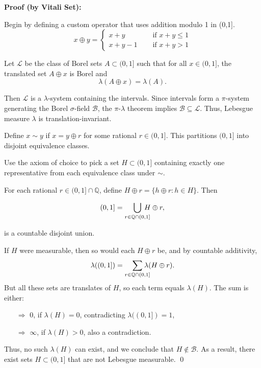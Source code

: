     \textbf{Proof (by Vitali Set):}
    \vspace{-1ex}
    \begin{proofline}
    Begin by defining a custom operator that uses addition modulo 1 in (0,1].
    \[
    x\oplus y = \begin{cases}
        x+y \quad &\text{ if } x+y \leq 1\\
        x+y-1 \quad &\text{ if } x+y > 1
    \end{cases}
    \]

    Let \( \mathcal{L} \) be the class of Borel sets \( A \subset (0,1] \) such that for all \( x \in (0,1] \), the translated set \( A \oplus x \) is Borel and
    \[
    \lambda(A \oplus x) = \lambda(A).
    \]
    
    Then \( \mathcal{L} \) is a \( \lambda \)-system containing the intervals. Since intervals form a \( \pi \)-system generating the Borel \( \sigma \)-field \( \mathcal{B} \), the \( \pi \)-\( \lambda \) theorem implies \( \mathcal{B} \subseteq \mathcal{L} \). Thus, Lebesgue measure \( \lambda \) is translation-invariant.

    Define \( x \sim y \) if \( x = y \oplus r \) for some rational \( r \in (0,1] \). This partitions \( (0,1] \) into disjoint equivalence classes.

    Use the axiom of choice to pick a set \( H \subset (0,1] \) containing exactly one representative from each equivalence class under \( \sim \).

    For each rational \( r \in (0,1] \cap \mathbb{Q} \), define \( H \oplus r = \{ h \oplus r : h \in H \} \). Then
    
    \[
    (0,1] = \bigcup_{r \in \mathbb{Q} \cap (0,1]} \hspace{-1em}H \oplus r,
    \]
    
    is a countable disjoint union.

    If \( H \) were measurable, then so would each \( H \oplus r \) be, and by countable additivity,
    \[
    \lambda((0,1]) = \sum_{r \in \mathbb{Q} \cap (0,1]} \hspace{-1em}\lambda(H \oplus r).
    \]
    But all these sets are translates of \( H \), so each term equals \( \lambda(H) \). The sum is either:
    \begin{itemize}
        \item[$\Rightarrow$] 0, if \( \lambda(H) = 0 \), contradicting \( \lambda((0,1]) = 1 \), 
        \vspace{-2.5ex}
        \item[$\Rightarrow$] \( \infty \), if \( \lambda(H) > 0 \), also a contradiction.
    \end{itemize}
    Thus, no such \( \lambda(H) \) can exist, and we conclude that \( H \notin \mathcal{B} \). As a result, there exist sets \( H \subset (0,1] \) that are not Lebesgue measurable. \hfill \qed
    \end{proofline}

    \newpage